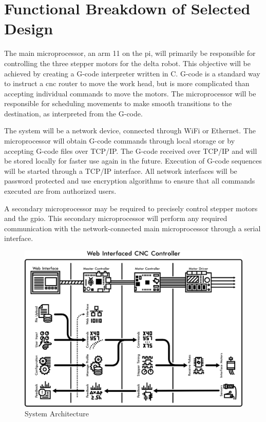 \chapter{Functional Breakdown of Selected Design}
The main microprocessor, an \gls{arm} 11 on the \gls{pi}, will primarily be responsible for controlling the three stepper motors for the delta robot.
This objective will be achieved by creating a G-code interpreter written in C.
G-code is a standard way to instruct a \gls{cnc} router to move the work head, but is more complicated than accepting individual commands to move the motors.
The microprocessor will be responsible for scheduling movements to make smooth transitions to the destination, as interpreted from the G-code.

The system will be a network device, connected through WiFi or Ethernet.
The microprocessor will obtain G-code commands through local storage or by accepting G-code files over TCP/IP.
The G-code received over TCP/IP and will be stored locally for faster use again in the future.
Execution of G-code sequences will be started through a TCP/IP interface.
All network interfaces will be password protected and use encryption algorithms to ensure that all commands executed are from authorized users. 

A secondary microprocessor may be required to precisely control stepper motors and the \gls{gpio}.
This secondary microprocessor will perform any required communication with the network-connected main microprocessor through a serial interface. 

\begin{figure}[h]
	\centering
	\includegraphics[width=1\textwidth]{architecture.png}
	\caption{System Architecture}
	\label{fig:architecture}
\end{figure}

